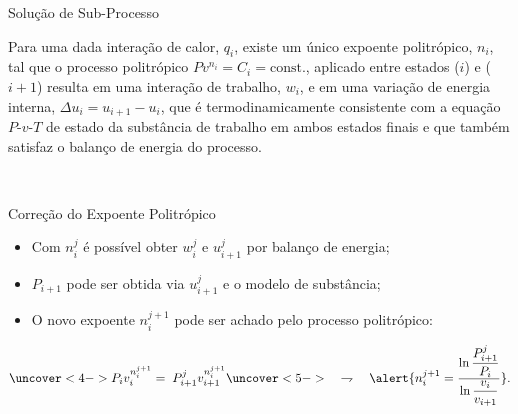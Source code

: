     \begin{frame}{Solução de Sub-Processo}\vspace*{-2em}
        \begin{cnj}
            Para  uma  dada  interação  de  calor,  $q_i$,  existe  um   \alert{único   expoente
            politrópico,  $n_i$},  tal  que  o  processo   politrópico   $Pv^{n_i}   =   C_i   =
            \mathrm{const.}$, aplicado entre estados ($i$) e ($i+1$) resulta em uma interação de
            trabalho, $w_i$, e em uma variação de energia interna, $\Delta u_i = u_{i+1} - u_i$,
            que é \alert{termodinamicamente consistente} com  a  \alert{equação  $P$-$v$-$T$  de
            estado} da substância de trabalho em ambos estados finais e que  também  satisfaz  o
            \alert{balanço de energia} do processo.
        \end{cnj}
        \vspace*{\smallskipamount}\\
        \vspace*{\smallskipamount}
    \end{frame}

    \begin{frame}{Correção do Expoente Politrópico}\vspace*{-2em}
        \begin{itemize}
            \item<1-> Com $n_i^j$ é possível obter $w_i^j$ e $u_{i+1}^j$ por  \alert{balanço  de
                energia};
            \item<2->  $P_{i+1}$  pode  ser  obtida  via  $u_{i+1}^j$  e  o   \alert{modelo   de
                substância};
            \item<3->  O  novo  expoente  $n_i^{j+1}$  pode  ser  achado  pelo   \alert{processo
                politrópico}:\\[\bigskipamount]
        \end{itemize}
        \begin{equation}
            \uncover<4->{
                P_iv_i^{n_i^{j+1}} = \;P_{i+1}^jv_{i+1}^{n_i^{j+1}}
            }
            \uncover<5->{
                \quad\rightharpoondown\quad\alert{
                n_i^{j+1} = \dfrac{
                        \ln\dfrac{P_{i+1}^j}{P_i}
                    }{
                        \ln\dfrac{v_i}{v_{i+1}}
                    }
                }.\nonumber
            }
        \end{equation}
    \end{frame}

